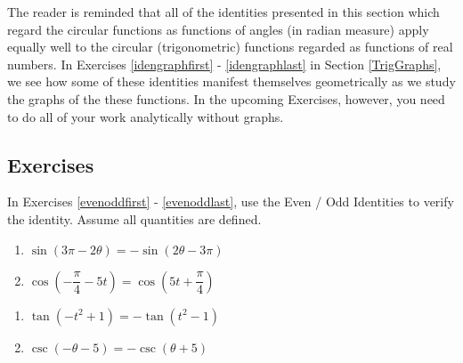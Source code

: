 The reader is reminded that all of the identities presented in this section which regard the circular functions as functions of angles (in radian measure) apply equally well to the circular (trigonometric) functions regarded as functions of real numbers.  In Exercises \ref{idengraphfirst} - \ref{idengraphlast} in Section \ref{TrigGraphs}, we see how some of these identities manifest themselves geometrically as we study the graphs of the these functions.  In the upcoming Exercises, however, you need to do all of your work analytically without graphs.

\newpage

\subsection{Exercises}

In Exercises \ref{evenoddfirst} - \ref{evenoddlast}, use the Even / Odd Identities to verify the identity.  Assume all quantities are defined.

\begin{multicols}{2}

\begin{enumerate}

\item $\sin(3\pi - 2\theta) = -\sin(2\theta - 3\pi)$  \label{evenoddfirst}
\item $\cos \left( -\dfrac{\pi}{4} - 5t \right) = \cos \left( 5t + \dfrac{\pi}{4} \right)$

\setcounter{HW}{\value{enumi}}

\end{enumerate}

\end{multicols}

\begin{multicols}{2}

\begin{enumerate}

\setcounter{enumi}{\value{HW}}

\item $\tan(-t^{2} + 1) = -\tan(t^{2} - 1)$
\item $\csc(-\theta - 5) = -\csc(\theta + 5)$

\setcounter{HW}{\value{enumi}}

\end{enumerate}

\end{multicols}

